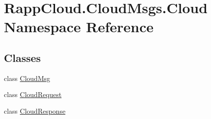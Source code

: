 \hypertarget{namespaceRappCloud_1_1CloudMsgs_1_1Cloud}{\section{Rapp\-Cloud.\-Cloud\-Msgs.\-Cloud Namespace Reference}
\label{namespaceRappCloud_1_1CloudMsgs_1_1Cloud}
}
\subsection*{Classes}
\begin{DoxyCompactItemize}
\item 
class \hyperlink{classRappCloud_1_1CloudMsgs_1_1Cloud_1_1CloudMsg}{Cloud\-Msg}
\item 
class \hyperlink{classRappCloud_1_1CloudMsgs_1_1Cloud_1_1CloudRequest}{Cloud\-Request}
\item 
class \hyperlink{classRappCloud_1_1CloudMsgs_1_1Cloud_1_1CloudResponse}{Cloud\-Response}
\end{DoxyCompactItemize}
